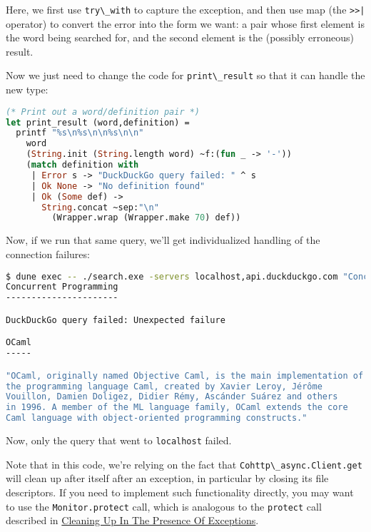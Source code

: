 Here, we first use \passthrough{\lstinline!try\_with!} to capture the
exception, and then use map (the \passthrough{\lstinline!>>|!} operator)
to convert the error into the form we want: a pair whose first element
is the word being searched for, and the second element is the (possibly
erroneous) result.

Now we just need to change the code for
\passthrough{\lstinline!print\_result!} so that it can handle the new
type:

\begin{lstlisting}[language=Caml]
(* Print out a word/definition pair *)
let print_result (word,definition) =
  printf "%s\n%s\n\n%s\n\n"
    word
    (String.init (String.length word) ~f:(fun _ -> '-'))
    (match definition with
     | Error s -> "DuckDuckGo query failed: " ^ s
     | Ok None -> "No definition found"
     | Ok (Some def) ->
       String.concat ~sep:"\n"
         (Wrapper.wrap (Wrapper.make 70) def))
\end{lstlisting}

Now, if we run that same query, we'll get individualized handling of the
connection failures:

\begin{lstlisting}[language=bash]
$ dune exec -- ./search.exe -servers localhost,api.duckduckgo.com "Concurrent Programming" OCaml
Concurrent Programming
----------------------

DuckDuckGo query failed: Unexpected failure

OCaml
-----

"OCaml, originally named Objective Caml, is the main implementation of
the programming language Caml, created by Xavier Leroy, Jérôme
Vouillon, Damien Doligez, Didier Rémy, Ascánder Suárez and others
in 1996. A member of the ML language family, OCaml extends the core
Caml language with object-oriented programming constructs."
\end{lstlisting}

Now, only the query that went to \passthrough{\lstinline!localhost!}
failed.

Note that in this code, we're relying on the fact that
\passthrough{\lstinline!Cohttp\_async.Client.get!} will clean up after
itself after an exception, in particular by closing its file
descriptors. If you need to implement such functionality directly, you
may want to use the \passthrough{\lstinline!Monitor.protect!} call,
which is analogous to the \passthrough{\lstinline!protect!} call
described in
\href{error-handling.html\#cleaning-up-in-the-presence-of-exceptions}{Cleaning
Up In The Presence Of Exceptions}.~

